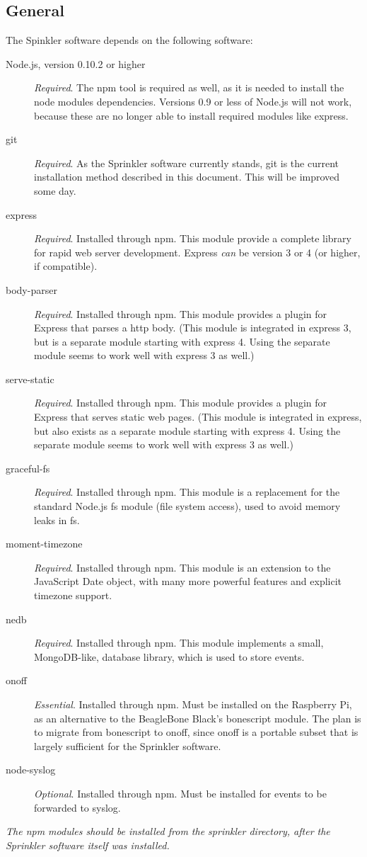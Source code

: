 \documentclass[11pt]{book}
\begin{document}
\subsection{General}
The Spinkler software depends on the following software:
\begin{description}
\item[Node.js, version 0.10.2 or higher] \emph{Required}. The npm tool is required as well, as it is needed to install the node modules dependencies. Versions 0.9 or less of Node.js will not work, because these are no longer able to install required modules like express.
\item[git] \emph{Required}. As the Sprinkler software currently stands, git is the current installation method described in this document. This will be improved some day.
\item[express] \emph{Required}. Installed through npm. This module provide a complete library for rapid web server development. Express \emph{can} be version 3 or 4 (or higher, if compatible).
\item[body-parser] \emph{Required}. Installed through npm. This module provides a plugin for Express that parses a http body. (This module is integrated in express 3, but is a separate module starting with express 4. Using the separate module seems to work well with express 3 as well.)
\item[serve-static] \emph{Required}. Installed through npm. This module provides a plugin for Express that serves static web pages. (This module is integrated in express, but also exists as a separate module starting with express 4. Using the separate module seems to work well with express 3 as well.)
\item[graceful-fs] \emph{Required}. Installed through npm. This module is a replacement for the standard Node.js fs module (file system access), used to avoid memory leaks in fs.
\item[moment-timezone] \emph{Required}. Installed through npm. This module is an extension to the JavaScript Date object, with many more powerful features and explicit timezone support.
\item[nedb] \emph{Required}. Installed through npm. This module implements a small, MongoDB-like, database library, which is used to store events.
\item[onoff] \emph{Essential}. Installed through npm. Must be installed on the Raspberry Pi, as an alternative to the BeagleBone Black's bonescript module. The plan is to migrate from bonescript to onoff, since onoff is a portable subset that is largely sufficient for the Sprinkler software.
\item[node-syslog] \emph{Optional}. Installed through npm. Must be installed for events to be forwarded to syslog. 
\end{description}
\emph{The npm modules should be installed from the sprinkler directory, after the Sprinkler software itself was installed.}
\end{document}

